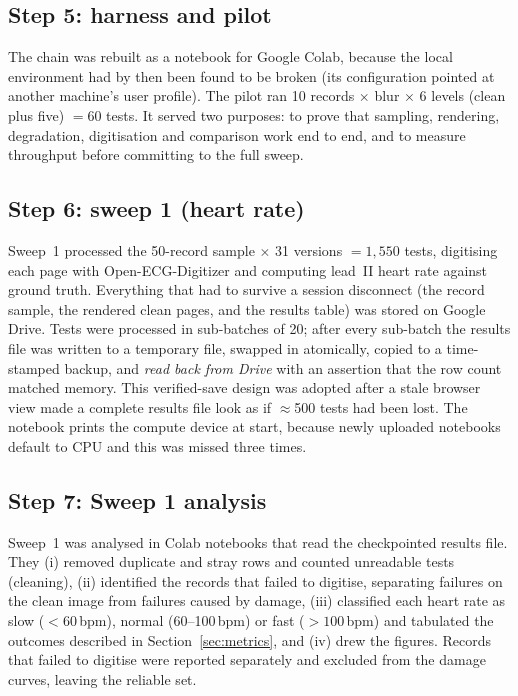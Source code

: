 \subsection{Step 5: harness and pilot}
The chain was rebuilt as a notebook for Google Colab, because the local environment had by then been found to be broken (its configuration pointed at another machine's user profile). The pilot ran 10 records $\times$ blur $\times$ 6 levels (clean plus five) $=60$ tests. It served two purposes: to prove that sampling, rendering, degradation, digitisation and comparison work end to end, and to measure throughput before committing to the full sweep.

\subsection{Step 6: sweep 1 (heart rate)}\label{sec:sweep1}
Sweep~1 processed the 50-record sample $\times$ 31 versions $=1{,}550$ tests, digitising each page with Open-ECG-Digitizer and computing lead~II heart rate against ground truth. Everything that had to survive a session disconnect (the record sample, the rendered clean pages, and the results table) was stored on Google Drive. Tests were processed in sub-batches of 20; after every sub-batch the results file was written to a temporary file, swapped in atomically, copied to a time-stamped backup, and \emph{read back from Drive} with an assertion that the row count matched memory. This verified-save design was adopted after a stale browser view made a complete results file look as if $\approx$500 tests had been lost. The notebook prints the compute device at start, because newly uploaded notebooks default to CPU and this was missed three times.

\subsection{Step 7: Sweep 1 analysis}\label{sec:sweep1analysis}
Sweep~1 was analysed in Colab notebooks that read the checkpointed results file. They (i) removed duplicate and stray rows and counted unreadable tests (cleaning), (ii) identified the records that failed to digitise, separating failures on the clean image from failures caused by damage, (iii) classified each heart rate as slow ($<60$\,bpm), normal (60--100\,bpm) or fast ($>100$\,bpm) and tabulated the outcomes described in Section~\ref{sec:metrics}, and (iv) drew the figures. Records that failed to digitise were reported separately and excluded from the damage curves, leaving the reliable set.

